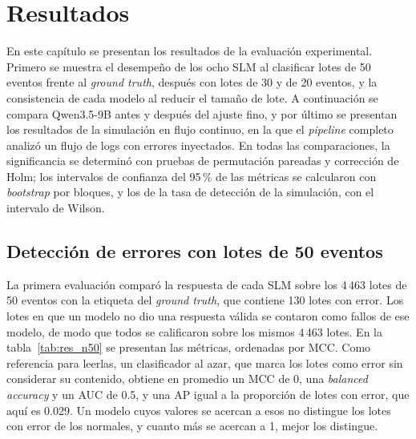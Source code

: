 \chapter{Resultados}\label{cap:resultados}

En este capítulo se presentan los resultados de la evaluación experimental. Primero se muestra el desempeño de los ocho SLM al clasificar lotes de 50 eventos frente al \textit{ground truth}, después con lotes de 30 y de 20 eventos, y la consistencia de cada modelo al reducir el tamaño de lote. A continuación se compara Qwen3.5-9B antes y después del ajuste fino, y por último se presentan los resultados de la simulación en flujo continuo, en la que el \textit{pipeline} completo analizó un flujo de logs con errores inyectados. En todas las comparaciones, la significancia se determinó con pruebas de permutación pareadas y corrección de Holm; los intervalos de confianza del 95\,\% de las métricas se calcularon con \textit{bootstrap} por bloques, y los de la tasa de detección de la simulación, con el intervalo de Wilson.

\section{Detección de errores con lotes de 50 eventos}\label{sec:res_n50}

La primera evaluación comparó la respuesta de cada SLM sobre los 4\,463 lotes de 50 eventos con la etiqueta del \textit{ground truth}, que contiene 130 lotes con error. Los lotes en que un modelo no dio una respuesta válida se contaron como fallos de ese modelo, de modo que todos se calificaron sobre los mismos 4\,463 lotes. En la tabla~\ref{tab:res_n50} se presentan las métricas, ordenadas por MCC. Como referencia para leerlas, un clasificador al azar, que marca los lotes como error sin considerar su contenido, obtiene en promedio un MCC de 0, una \textit{balanced accuracy} y un AUC de 0.5, y una AP igual a la proporción de lotes con error, que aquí es 0.029. Un modelo cuyos valores se acercan a esos no distingue los lotes con error de los normales, y cuanto más se acercan a 1, mejor los distingue.

